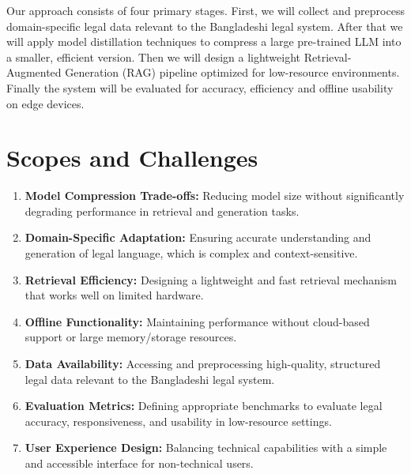 Our approach consists of four primary stages. First, we will collect and preprocess domain-specific legal data relevant to the Bangladeshi legal system. After that we will apply model distillation techniques to compress a large pre-trained LLM into a smaller, efficient version. Then we will design a lightweight Retrieval-Augmented Generation (RAG) pipeline optimized for low-resource environments. Finally the system will be evaluated for accuracy, efficiency and offline usability on edge devices. 

\section{Scopes and Challenges}



\begin{enumerate}
    \item \textbf{Model Compression Trade-offs:} Reducing model size without significantly degrading performance in retrieval and generation tasks.
    
    \item \textbf{Domain-Specific Adaptation:} Ensuring accurate understanding and generation of legal language, which is complex and context-sensitive.
    
    \item \textbf{Retrieval Efficiency:} Designing a lightweight and fast retrieval mechanism that works well on limited hardware.
    
    \item \textbf{Offline Functionality:} Maintaining performance without cloud-based support or large memory/storage resources.
    
    \item \textbf{Data Availability:} Accessing and preprocessing high-quality, structured legal data relevant to the Bangladeshi legal system.
    
    \item \textbf{Evaluation Metrics:} Defining appropriate benchmarks to evaluate legal accuracy, responsiveness, and usability in low-resource settings.
    
    \item \textbf{User Experience Design:} Balancing technical capabilities with a simple and accessible interface for non-technical users.
\end{enumerate}






